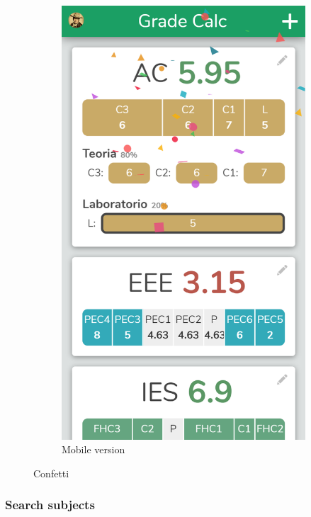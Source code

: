 \begin{figure}[ht!]
\begin{subfigure}[b]{0.243\textwidth-0.1cm}
        \includegraphics[width=\textwidth]{media/screenshots/screenshot-confetti.png}
        \caption{Mobile version}
    \end{subfigure}
    \caption{Confetti}
    \label{fig:confetti}
\end{figure}
\vfill

\clearpage\newpage
\subsubsection{Search subjects}

